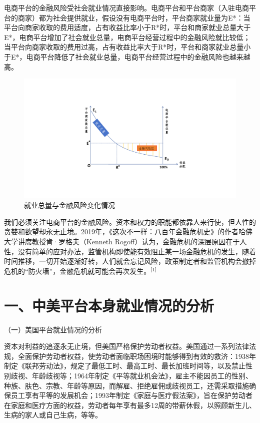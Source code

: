 \documentclass[12pt,twoside,utf8]{ctexart}
\begin{document}
电商平台的金融风险受社会就业情况直接影响。电商平台和平台商家（入驻电商平台的商家）都为社会提供就业，假设没有电商平台时，平台商家就业量为E*：当平台向商家收取的费用适度，占有收益比率小于R{*}时，平台和商家就业总量大于E*，电商平台增加了社会就业总量，电商平台经营过程中的金融风险就比较低；当平台向商家收取的费用过高，占有收益比率大于R*时，平台和商家就业总量小于E*，电商平台降低了社会就业总量，电商平台经营过程中的金融风险也越来越高。

\begin{figure}[hbt!]
\centering
\includegraphics[width=0.7\linewidth]{1.pdf}
\caption{就业总量与金融风险变化情况}
\label{fig:map}
\end{figure} 

我们必须关注电商平台的金融风险。资本和权力的职能都依靠人来行使，但人性的贪婪和欲望却永无止境。2019年，《这次不一样：八百年金融危机史》的作者哈佛大学讲席教授肯·罗格夫（Kenneth  Rogoff）认为，金融危机的深层原因在于人性，没有简单的应对办法，监管机构即使能有效阻止某一场金融危机的发生，随着时间推移，一切开始逐渐好转，人们就会忘记风险，政策制定者和监管机构会撤掉危机的“防火墙”，金融危机就可能会再次发生。$\textsuperscript{[1]}$

{\centering\section *{一、中美平台本身就业情况的分析}}

（一）美国平台就业情况的分析

资本对利益的追逐永无止境，但美国严格保护劳动者权益。美国通过一系列法律法规，全面保护劳动者权益，使劳动者面临职场困境时能够得到有效的救济：1938年制定《联邦劳动法》，规定了最低工时、最高工时、最长加班时间等，以及禁止性别歧视、年龄歧视等；1964年制定《平等就业机会法》，雇主不能因员工的性别、种族、肤色、宗教、年龄等原因，而解雇、拒绝雇佣或歧视员工，还需采取措施确保员工享有平等的发展机会；1993年制定《家庭与医疗假法案》，旨在保护劳动者在家庭和医疗方面的权益，劳动者每年享有最多12周的带薪休假，以照顾新生儿、生病的家人或自己生病，等等。
\end{document}
